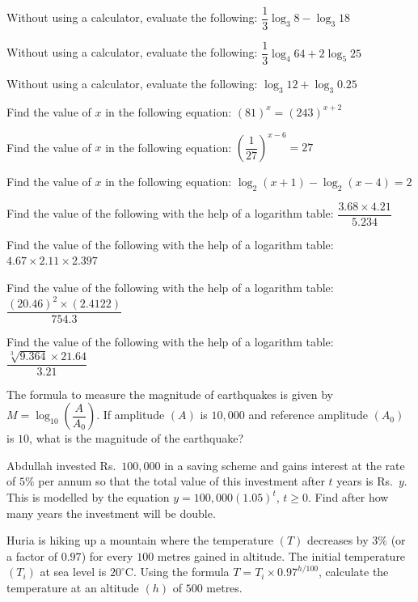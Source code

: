 \documentclass[11pt]{article}
\begin{document}
\begin{detq}
\item Without using a calculator, evaluate the following: $\dfrac{1}{3}\log_3 8 - \log_3 18$

\item Without using a calculator, evaluate the following: $\dfrac{1}{3}\log_4 64 + 2\log_5 25$

\item Without using a calculator, evaluate the following: $\log_3 12 + \log_3 0.25$

\item Find the value of $x$ in the following equation: $(81)^x = (243)^{x+2}$

\item Find the value of $x$ in the following equation: $\left(\dfrac{1}{27}\right)^{x-6}=27$

\item Find the value of $x$ in the following equation: $\log_2(x+1)-\log_2(x-4)=2$

\item Find the value of the following with the help of a logarithm table: $\dfrac{3.68\times4.21}{5.234}$

\item Find the value of the following with the help of a logarithm table: $4.67\times2.11\times2.397$

\item Find the value of the following with the help of a logarithm table: $\dfrac{(20.46)^2\times(2.4122)}{754.3}$

\item Find the value of the following with the help of a logarithm table: $\dfrac{\sqrt[3]{9.364}\times21.64}{3.21}$

\item The formula to measure the magnitude of earthquakes is given by $M=\log_{10}\left(\dfrac{A}{A_0}\right)$. If amplitude $(A)$ is $10{,}000$ and reference amplitude $(A_0)$ is $10$, what is the magnitude of the earthquake?

\item Abdullah invested Rs.\ $100{,}000$ in a saving scheme and gains interest at the rate of $5\%$ per annum so that the total value of this investment after $t$ years is Rs.\ $y$. This is modelled by the equation $y=100{,}000(1.05)^t$, $t\geq0$. Find after how many years the investment will be double.

\item Huria is hiking up a mountain where the temperature $(T)$ decreases by $3\%$ (or a factor of $0.97$) for every $100$ metres gained in altitude. The initial temperature $(T_i)$ at sea level is $20^{\circ}$C. Using the formula $T=T_i\times0.97^{h/100}$, calculate the temperature at an altitude $(h)$ of $500$ metres.


\end{detq}
\end{document}
